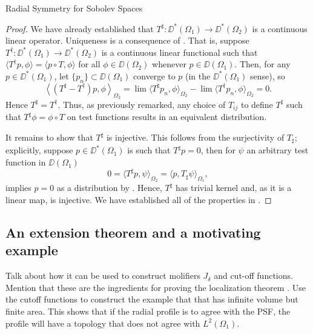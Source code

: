\begin{chapter}{Radial Symmetry for Sobolev Spaces}
\begin{thm}
\end{thm}
\begin{proof}
  We have already established that $T^\sharp:\DD^*(\Omega_1)\to \DD^*(\Omega_2)$ is a continuous linear operator.
  Uniqueness is a consequence of . That is, suppose $T^\dagger:\DD^*(\Omega_1) \to \DD^*(\Omega_2)$ is a continuous linear functional such that $\langle T^\dagger p,\phi \rangle = \langle p \circ T, \phi\rangle$ for all $\phi \in \DD(\Omega_2)$ whenever $p \in \DD(\Omega_1)$. Then, for any $p \in \DD^*(\Omega_1)$, let $\{p_n\}\subset \DD(\Omega_1)$ converge to $p$ (in the $\DD^*(\Omega_1)$ sense), so 
  \begin{equation}
    \left\langle (T^\sharp - T^\dagger)p,\phi\right\rangle_{\Omega_2} = \lim \langle T^\sharp p_n,\phi\rangle_{\Omega_2} - \lim \langle T^\dagger p_n,\phi\rangle_{\Omega_2} = 0.
  \end{equation}
  Hence $T^\sharp = T^\dagger$.
  Thus, as previously remarked, any choice of $T_{ij}$ to define $T^\sharp$ such that $T^\sharp \phi = \phi \circ T$ on test functions results in an equivalent distribution.
  
  It remains to show that $T^\sharp$ is injective. 
  This follows from the surjectivity of $T_\sharp$; explicitly, suppose $p \in \DD^*(\Omega_1)$ is such that $T^\sharp p = 0$, then for $\psi$ an arbitrary test function in $\DD(\Omega_1)$
  \begin{equation}
    0 = \Big\langle T^\sharp p, \psi \Big\rangle_{\Omega_2} = \Big\langle p, T_\sharp \psi\Big\rangle_{\Omega_1},
  \end{equation}
  implies $p = 0$ as a distribution by .  
  Hence, $T^\sharp$ has trivial kernel and, as it is a linear map, is injective.
  We have established all of the properties in .
\end{proof}

\subsection{An extension theorem and a motivating example}
\begin{com}
  Talk about how it can be used to construct molifiers $J_\delta$ and cut-off functions. 
  Mention that these are the ingredients for proving the localization theorem .
  Use the cutoff functions to construct the example that that has infinite volume but finite area. 
  This shows that if the radial profile is to agree with the PSF, the profile will have a topology that does not agree with $L^2(\Omega_1)$.
\end{com}


\end{chapter}
